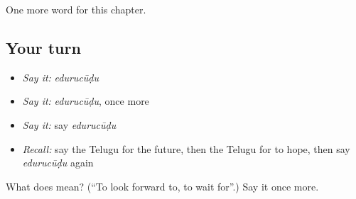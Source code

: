\begin{grammarlens}[title={What you've built}]
One more word for this chapter.
\end{grammarlens}

\subsection*{Your turn}
\begin{itemize}
\raggedright
  \item \emph{Say it:} \emph{edurucūḍu}
  \item \emph{Say it:} \emph{edurucūḍu}, once more
  \item \emph{Say it:} say \emph{edurucūḍu}
  \item \emph{Recall:} say the Telugu for the future, then the Telugu for to hope, then say \emph{edurucūḍu} again
\end{itemize}

\begin{tcolorbox}[breakable,colback=teal!4,colframe=teal!35!black,title={Before you move on}]
What does  mean? (\textquotedblleft{}To look forward to, to wait for\textquotedblright{}.) Say it once more.
\end{tcolorbox}
